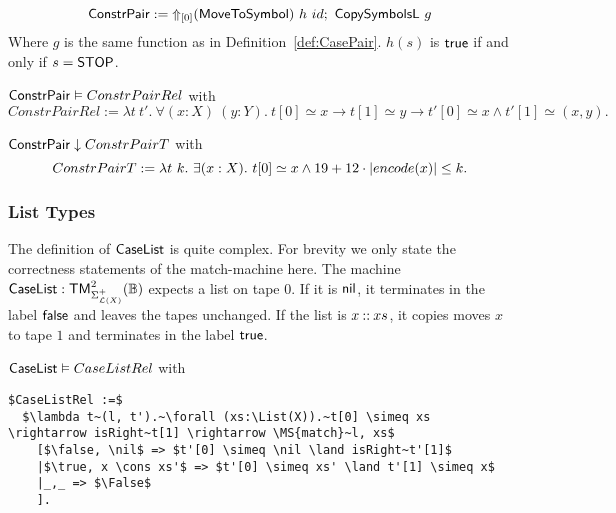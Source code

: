\begin{definition}
  \label{def:Constr_pair}
  ~
  \[
    \MS{ConstrPair} := \LiftTapes{(\MS{MoveToSymbol})}{\Vector{0}}~h~id \Seq \MS{CopySymbolsL}~g
  \]
  Where $g$ is the same function as in Definition~\ref{def:CasePair}.  $h(s)$ is $\true$ if and only if $s=\MS{STOP}$.
\end{definition}

\begin{lemma}
  \label{lem:Constr_pair_Realise}
  \small
  $\MS{ConstrPair} \Realise ConstrPairRel$ with
  \[
    ConstrPairRel := \lambda t~t'.~\forall (x:X)~(y:Y).~t[0] \simeq x \rightarrow t[1] \simeq y \rightarrow t'[0] \simeq x \land t'[1] \simeq (x,y).
  \]
\end{lemma}
\begin{lemma}
  \label{lem:Constr_pair_TerminatesIn}
  $\MS{ConstrPair} \TerminatesIn ConstrPairT$ with
  \[
    ConstrPairT := \lambda t~k.~\exists (x: X).~t[0] \simeq x \land 19 + 12 \cdot \size{x} \leq k.
  \]
\end{lemma}

\subsubsection{List Types}
\label{sec:CaseList}
%

The definition of $\MS{CaseList}$ is quite complex.  For brevity we only state the correctness statements of the match-machine here.  The machine
$\MS{CaseList} : \TM_{\Sigma_{\List(X)}^+}^2(\Bool)$ expects a list on tape $0$.  If it is $\nil$, it terminates in the label $\false$ and leaves the
tapes unchanged.  If the list is $x \cons xs$, it copies moves $x$ to tape $1$ and terminates in the label $\true$.

\begin{lemma}
  \label{lem:CaseList_Realise}
  $\MS{CaseList} \Realise CaseListRel$ with
\begin{lstlisting}[style=semicoqstyle]
$CaseListRel :=$
  $\lambda t~(l, t').~\forall (xs:\List(X)).~t[0] \simeq xs \rightarrow isRight~t[1] \rightarrow \MS{match}~l, xs$
    [$\false, \nil$ => $t'[0] \simeq \nil \land isRight~t'[1]$
    |$\true, x \cons xs'$ => $t'[0] \simeq xs' \land t'[1] \simeq x$
    |_,_ => $\False$
    ].
\end{lstlisting}
\end{lemma}

